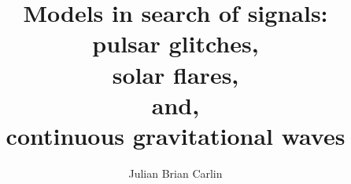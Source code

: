 \title{Models in search of signals:\\
\vspace{0.2em} pulsar glitches,\\
\vspace{0.2em} solar flares,\\
\vspace{0.2em} and, \\
\vspace{0.5em} continuous gravitational waves}
\author{Julian Brian Carlin}
